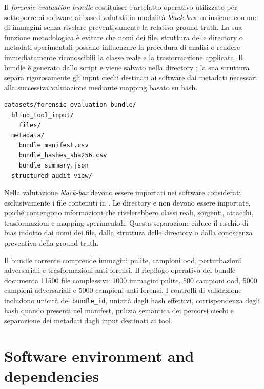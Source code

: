 Il \textit{forensic evaluation bundle} costituisce l'artefatto operativo utilizzato per sottoporre ai software \gls{ai}-based valutati in modalità \textit{black-box} un insieme comune di immagini senza rivelare preventivamente la relativa ground truth. La sua funzione metodologica è evitare che nomi dei file, struttura delle directory o metadati sperimentali possano influenzare la procedura di analisi o rendere immediatamente riconoscibili la classe reale e la trasformazione applicata. Il bundle è generato dallo script  e viene salvato nella directory ; la sua struttura separa rigorosamente gli input ciechi destinati ai software dai metadati necessari alla successiva valutazione mediante mapping basato su hash.

\begin{lstlisting}[caption={Struttura logica del forensic evaluation bundle.}, label={lst:forensic-evaluation-bundle-structure}]
datasets/forensic_evaluation_bundle/
  blind_tool_input/
    files/
  metadata/
    bundle_manifest.csv
    bundle_hashes_sha256.csv
    bundle_summary.json
  structured_audit_view/
\end{lstlisting}

Nella valutazione \textit{black-box} devono essere importati nei software considerati esclusivamente i file contenuti in . Le directory  e  non devono essere importate, poiché contengono informazioni che rivelerebbero classi reali, sorgenti, attacchi, trasformazioni e mapping sperimentali. Questa separazione riduce il rischio di bias indotto dai nomi dei file, dalla struttura delle directory o dalla conoscenza preventiva della ground truth.

Il bundle corrente comprende immagini pulite, campioni \gls{ood}, perturbazioni adversariali e trasformazioni anti-forensi. Il riepilogo operativo del bundle documenta 11500 file complessivi: 1000 immagini pulite, 500 campioni \gls{ood}, 5000 campioni adversariali e 5000 campioni anti-forensi. I controlli di validazione includono unicità del \texttt{bundle\_id}, unicità degli hash effettivi, corrispondenza degli hash quando presenti nel manifest, pulizia semantica dei percorsi ciechi e separazione dei metadati dagli input destinati ai tool.

\section{Software environment and dependencies}
\label{app:software-environment}

